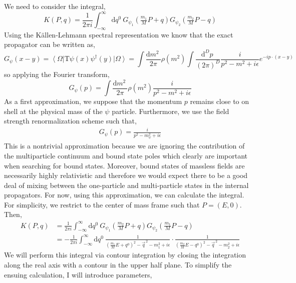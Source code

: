 \documentclass[12pt]{article}
\newcommand{\bra}[1]{\left| #1 \right>}
\newcommand{\ket}[1]{\left| #1 \right>}
\renewcommand{\bra}[1]{\left< #1 \right|}
\renewcommand{\d}[1]{ \mathrm{d}#1 \:}
\newcommand{\dn}[2]{ \mathrm{d}^{#1} #2 \:}
\begin{document}
We need to consider the integral, 
\begin{equation}
K(P, q) = \frac{1}{2 \pi i} \int_{-\infty}^{\infty} \d{q^0} G_{\psi_1}(\tfrac{m_1}{M} P + q) G_{\psi_2}(\tfrac{m_2}{M} P - q)
\end{equation}
Using the K\"{a}llen-Lehmann spectral representation we know that the exact propagator can be written as,
\begin{equation}
G_\psi(x-y) = \bra{\Omega} \mathrm{T} \psi(x) \psi^\dagger(y) \ket{\Omega} = \int \frac{\d{m^2}}{2 \pi} \rho(m^2) \int \frac{\dn{D}{p}}{(2\pi)^D} \frac{i}{p^2 - m^2 + i \epsilon} e^{-i p \cdot (x-y)}   
\end{equation} 
so applying the Fourier transform,
\begin{equation}
G_\psi(p) = \int \frac{\d{m^2}}{2 \pi} \rho(m^2) \frac{i}{p^2 - m^2 + i \epsilon} 
\end{equation}
As a first approximation, we suppose that the momentum $p$ remains close to on shell at the physical mass of the $\psi$ particle. Furthermore, we use the field strength renormalization scheme such that,
\begin{align*}
 G_{\psi}(p) = \frac{i}{p^2 - m_\psi^2 + i \epsilon} 
\end{align*}
This is a nontrivial approximation because we are ignoring the contribution of the multiparticle continuum and bound state poles which clearly are important when searching for bound states. Moreover, bound states of massless fields are necessarily highly relativistic and therefore we would expect there to be a good deal of mixing between the one-particle and multi-particle states in the internal propagators. For now, using this approximation, we can calculate the integral. For simplicity, we restrict to the center of mass frame such that $P = (E, 0)$. Then,
\begin{subequations}
\begin{align}
K(P, q) & = \frac{1}{2 \pi i} \int_{-\infty}^{\infty} \d{q^0} G_{\psi_1}(\tfrac{m_2}{M} P + q) G_{\psi_2}(\tfrac{m_1}{M} P - q)
\\
& = -\frac{1}{2 \pi i} \int_{-\infty}^{\infty} \d{q^0} \frac{1}{(\tfrac{m_1}{M} E + q^0)^2 - \vec{q}^{\, 2} - m_1^2 + i \epsilon} \cdot \frac{1}{(\tfrac{m_2}{M} E - q^0)^2 - \vec{q}^{\, 2} - m_2^2 + i \epsilon}
\end{align}
\end{subequations}
We will perform this integral via contour integration by closing the integration along the real axis with a contour in the upper half plane. To simplify the ensuing calculation, I will introduce parameters,
\end{document}
